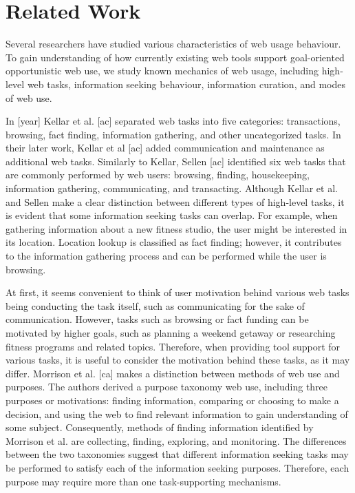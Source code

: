 \documentclass{casconpaper}
\begin{document}
{\section{Related Work}

Several researchers have studied various characteristics of web usage behaviour. To gain understanding of how currently existing web tools support goal-oriented opportunistic web use, we study known mechanics of web usage, including high-level web tasks, information seeking behaviour, information curation, and modes of web use. 

In [year] Kellar et al. [ac] separated web tasks into five categories: transactions, browsing, fact finding, information gathering, and other uncategorized tasks.  In their later work, Kellar et al [ac] added communication and maintenance as additional web tasks. Similarly to Kellar, Sellen [ac] identified six web tasks that are commonly performed by web users: browsing, finding, housekeeping, information gathering, communicating, and transacting. Although Kellar et al. and Sellen make a clear distinction between different types of high-level tasks, it is evident that some information seeking tasks can overlap. For example, when gathering information about a new fitness studio, the user might be interested in its location. Location lookup is classified as fact finding; however, it contributes to the information gathering process and can be performed while the user is browsing.

At first, it seems convenient to think of user motivation behind various web tasks being conducting the task itself, such as communicating for the sake of communication. However, tasks such as browsing or fact funding can be motivated by higher goals, such as planning a weekend getaway or researching fitness programs and related topics. Therefore, when providing tool support for various tasks, it is useful to consider the motivation behind these tasks, as it may differ. Morrison et al. [ca] makes a distinction between methods of web use and purposes. The authors derived a purpose taxonomy web use, including three purposes or motivations: finding information, comparing or choosing to make a decision, and using the web to find relevant information to gain understanding of some subject. Consequently, methods of finding information identified by Morrison et al. are collecting, finding, exploring, and monitoring. The differences between the two taxonomies suggest that different information seeking tasks may be performed to satisfy each of the information seeking purposes. Therefore, each purpose may require more than one task-supporting mechanisms. 

}
\end{document}
